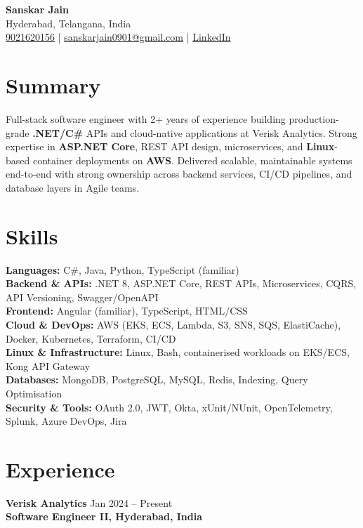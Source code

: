 \documentclass[letterpaper,10pt]{article}
\begin{document}
\begin{center}
    {\LARGE \textbf{Sanskar Jain}} \\
    Hyderabad, Telangana, India \\
    \href{tel:9021620156}{9021620156} \;|\;
    \href{mailto:sanskarjain0901@gmail.com}{sanskarjain0901@gmail.com} \;|\;
    \href{https://www.linkedin.com/in/sanskar-jain0901/}{LinkedIn}
\end{center}

\vspace{3pt}

\section*{Summary}
Full-stack software engineer with 2+ years of experience building production-grade \textbf{.NET/C\#} APIs and cloud-native applications at Verisk Analytics.
Strong expertise in \textbf{ASP.NET Core}, REST API design, microservices, and \textbf{Linux}-based container deployments on \textbf{AWS}.
Delivered scalable, maintainable systems end-to-end with strong ownership across backend services, CI/CD pipelines, and database layers in Agile teams.

\section*{Skills}
\textbf{Languages:} C\#, Java, Python, TypeScript (familiar) \\
\textbf{Backend \& APIs:} .NET 8, ASP.NET Core, REST APIs, Microservices, CQRS, API Versioning, Swagger/OpenAPI \\
\textbf{Frontend:} Angular (familiar), TypeScript, HTML/CSS \\
\textbf{Cloud \& DevOps:} AWS (EKS, ECS, Lambda, S3, SNS, SQS, ElastiCache), Docker, Kubernetes, Terraform, CI/CD \\
\textbf{Linux \& Infrastructure:} Linux, Bash, containerised workloads on EKS/ECS, Kong API Gateway \\
\textbf{Databases:} MongoDB, PostgreSQL, MySQL, Redis, Indexing, Query Optimisation \\
\textbf{Security \& Tools:} OAuth 2.0, JWT, Okta, xUnit/NUnit, OpenTelemetry, Splunk, Azure DevOps, Jira

\section*{Experience}

\textbf{Verisk Analytics} \hfill Jan 2024 -- Present \\
\textbf{Software Engineer II, Hyderabad, India}
\end{document}
